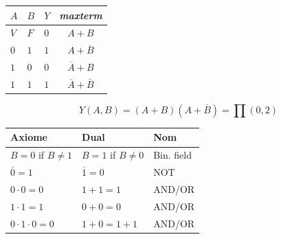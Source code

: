 \documentclass{report}
\begin{document}
\begin{multicols*}{3}
                \begin{table}[H]
                  \begin{center}
                   \renewcommand{\arraystretch}{1.5}
                     \footnotesize
                        \begin{tabular}{|l|l|l||c|}
                        \arrayrulecolor{blue}\hline
                        \rowcolor{lightBlue}
                        \textcolor{myb}{$A$} & \textcolor{myb}{$B$} 
                                           & \textcolor{myb}{$Y$} 
                                           & \textcolor{myb}{\textit{maxterm}}  
                        \\
                        \hline
                        \hline
                        \arrayrulecolor{black}
                        $V$ & $F$ & \cellcolor{myg} $0$ & \textcolor{myg}{$A + B$}
                        \\
                        \hline
                        $0$ & $1$ & \cellcolor{myr} $1$ & $A + \overline{B}$
                        \\
                        \hline 
                        $1$ & $0$ & \cellcolor{myg} $0$ & \textcolor{myg}{$\overline{A} + B$} 
                        \\ 
                        \hline
                        $1$ & $1$ & \cellcolor{myr} $1$ & $\overline{A} + \overline{B}$ 
                        \\
                        \hline
                        \end{tabular}
                \end{center}
                \end{table}
                \[Y(A, B) = (A+B)(A + \overline{B}) = \prod (0, 2) \]



    \begin{table}[H]
      \centering
      \renewcommand{\arraystretch}{1.5}
      \setlength{\arrayrulewidth}{0.4pt}
      \scriptsize
      \begin{tabular}{|l|l|l|}
        \hline
        \rowcolor{lightBlue}
        \textcolor{myb}{Axiome} & \textcolor{myb}{Dual} & \textcolor{myb}{Nom} \\
        \hline
        \hline
        \( B = 0 \) if \( B \neq 1 \) & \( B = 1 \) if \( B \neq 0 \) & Bin. field \\
        \rowcolor{lightBlue}
        \( \overline{0} = 1 \) & \( \overline{1} = 0 \) & NOT \\
        \( 0 \cdot 0 = 0 \) & \( 1 + 1 = 1 \) & AND/OR \\
        \rowcolor{lightBlue}
        \( 1 \cdot 1 = 1 \) & \( 0 + 0 = 0 \) & AND/OR \\
        \( 0 \cdot 1 \cdot 0 = 0 \) & \( 1 + 0 = 1 + 1 \) & AND/OR \\
        \hline
        \end{tabular}
    \end{table}




\end{multicols*}
\end{document}
